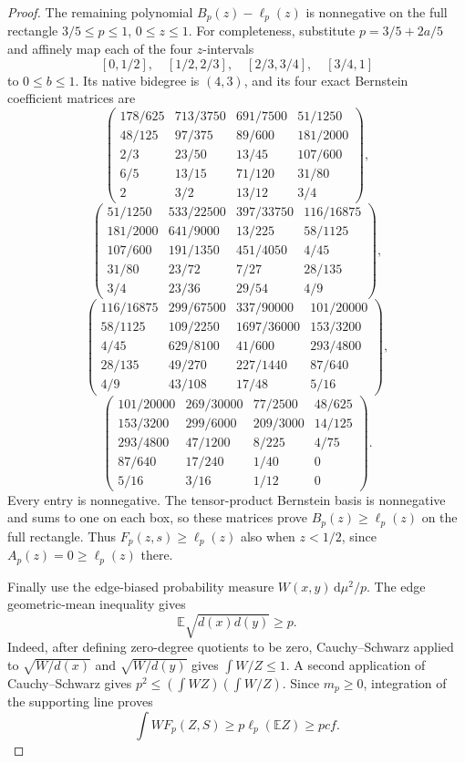 \documentclass[11pt]{article}
\newcommand{\dd}{\,\mathrm d}
\begin{document}
\begin{proof}
The remaining polynomial $B_p(z)-\ell_p(z)$ is nonnegative on the full
rectangle $3/5\leq p\leq1$, $0\leq z\leq1$.  For completeness, substitute
$p=3/5+2a/5$ and affinely map each of the four $z$-intervals
\[
 [0,1/2],\quad[1/2,2/3],\quad[2/3,3/4],\quad[3/4,1]
\]
to $0\leq b\leq1$.  Its native bidegree is $(4,3)$, and its four exact
Bernstein coefficient matrices are
\[
\begin{pmatrix}
178/625&713/3750&691/7500&51/1250\\
48/125&97/375&89/600&181/2000\\
2/3&23/50&13/45&107/600\\
6/5&13/15&71/120&31/80\\
2&3/2&13/12&3/4
\end{pmatrix},
\]
\[
\begin{pmatrix}
51/1250&533/22500&397/33750&116/16875\\
181/2000&641/9000&13/225&58/1125\\
107/600&191/1350&451/4050&4/45\\
31/80&23/72&7/27&28/135\\
3/4&23/36&29/54&4/9
\end{pmatrix},
\]
\[
\begin{pmatrix}
116/16875&299/67500&337/90000&101/20000\\
58/1125&109/2250&1697/36000&153/3200\\
4/45&629/8100&41/600&293/4800\\
28/135&49/270&227/1440&87/640\\
4/9&43/108&17/48&5/16
\end{pmatrix},
\]
\[
\begin{pmatrix}
101/20000&269/30000&77/2500&48/625\\
153/3200&299/6000&209/3000&14/125\\
293/4800&47/1200&8/225&4/75\\
87/640&17/240&1/40&0\\
5/16&3/16&1/12&0
\end{pmatrix}.
\]
Every entry is nonnegative.
The tensor-product Bernstein basis is nonnegative and sums to one on each
box, so these matrices prove $B_p(z)\geq\ell_p(z)$ on the full rectangle.
Thus $F_p(z,s)\geq\ell_p(z)$ also when
$z<1/2$, since $A_p(z)=0\geq\ell_p(z)$ there.

Finally use the edge-biased probability measure
$W(x,y)\dd\mu^2/p$.  The edge geometric-mean inequality gives
\[
 \mathbb E\sqrt{d(x)d(y)}\geq p.
\]
Indeed, after defining zero-degree quotients to be zero,
Cauchy--Schwarz applied to
$\sqrt{W/d(x)}$ and $\sqrt{W/d(y)}$ gives
$\int W/Z\leq1$.  A second application of Cauchy--Schwarz gives
$p^2\leq(\int WZ)(\int W/Z)$.  Since $m_p\geq0$, integration of the
supporting line proves
\[
 \int WF_p(Z,S)\geq p\ell_p(\mathbb E Z)\geq pcf.
\]
\end{proof}
\end{document}
